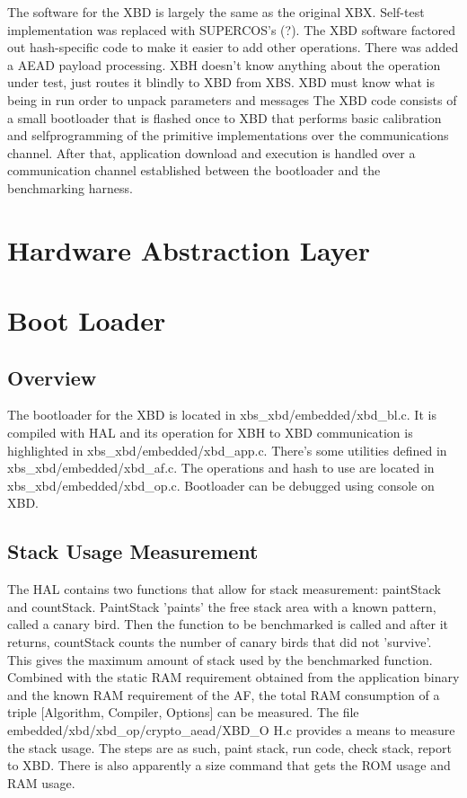 \documentclass[twoside,11pt]{cergdoc}
\begin{document}



The software for the XBD is largely the same
as the original XBX. Self-test implementation was
replaced with SUPERCOS's (?). The XBD
software factored out hash-specific code to
make it easier to add other operations. There
was added a AEAD payload processing.
XBH doesn't know anything about the
operation under test, just routes it blindly to
XBD from XBS. XBD must know what is
being in run order to unpack
parameters and messages
The XBD code consists of a small
bootloader that is flashed once to XBD that
performs basic calibration and selfprogramming
of the primitive
implementations over the communications
channel. After that, application download
and execution is handled over a
communication channel established between
the bootloader and the benchmarking
harness.

\chapter{Hardware Abstraction Layer}
\chapter{Boot Loader}
  \section{Overview}
The bootloader for the XBD is
located in xbs\_xbd/embedded/xbd\_bl.c. It is
compiled with HAL and its operation for
XBH to XBD communication is highlighted
in xbs\_xbd/embedded/xbd\_app.c. There’s
some utilities defined in
xbs\_xbd/embedded/xbd\_af.c. The operations
and hash to use are located in
xbs\_xbd/embedded/xbd\_op.c. Bootloader
can be debugged using console on XBD.

  \section{Stack Usage Measurement}
The HAL contains two functions that
allow for stack measurement: paintStack and
countStack. PaintStack ’paints’ the free
stack area with a known pattern, called a
canary bird. Then the function to be
benchmarked is called and after it returns,
countStack counts the number of canary
birds that did not ’survive’. This gives the
maximum amount of stack used by the
benchmarked function. Combined with the
static RAM requirement obtained from the
application binary and the known RAM
requirement of the AF, the total RAM
consumption of a triple [Algorithm,
Compiler, Options] can be measured.
The file
embedded/xbd/xbd\_op/crypto\_aead/XBD\_O
H.c provides a means to measure the stack
usage. The steps are as such, paint stack, run
code, check stack, report to XBD. There is
also apparently a size command that gets the
ROM usage and RAM usage.
\end{document}
